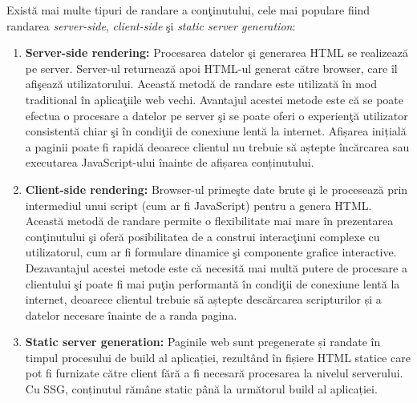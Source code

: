 \documentclass[12pt, a4paper]{report}
\begin{document}
Exist\u a mai multe tipuri de randare a con\c tinutului, cele mai populare fiind randarea \emph{server-side}, \emph{client-side} \c si  \emph{static server generation}: \cite{clientsidevssercerside}
\begin{enumerate}
	\item \textbf{Server-side rendering:} Procesarea datelor \c si generarea HTML se realizeaz\u a pe server. Server-ul returneaz\u a apoi HTML-ul generat c\u atre browser, care \^il afi\c seaz\u a utilizatorului. Aceast\u a metod\u a de randare este utilizat\u a \^in mod traditional \^in aplica\c tiile web vechi. Avantajul acestei metode este c\u a se poate efectua o procesare a datelor pe server \c si se poate oferi o experien\c t\u a utilizator consistent\u a chiar \c si \^in condi\c tii de conexiune lent\u a la internet. Afișarea inițială a paginii poate fi rapidă deoarece clientul nu trebuie să aștepte încărcarea sau executarea JavaScript-ului înainte de afișarea conținutului.
	\item \textbf{Client-side rendering:} Browser-ul prime\c ste date brute \c si le proceseaz\u a prin intermediul unui script (cum ar fi JavaScript) pentru a genera HTML. Aceast\u a metod\u a de randare permite o flexibilitate mai mare \^in prezentarea con\c tinutului \c si ofer\u a posibilitatea de a construi interac\c tiuni complexe cu utilizatorul, cum ar fi formulare dinamice \c si componente grafice interactive. Dezavantajul acestei metode este c\u a necesit\u a mai mult\u a putere de procesare a clientului \c si poate fi mai pu\c tin performant\u a \^in condi\c tii de conexiune lent\u a la internet, deoarece clientul trebuie să aștepte descărcarea scripturilor și a datelor necesare înainte de a randa pagina.
	\item \textbf{Static server generation:} Paginile web sunt pregenerate și randate în timpul procesului de build al aplicației, rezultând în fișiere HTML statice care pot fi furnizate către client fără a fi necesară procesarea la nivelul serverului. Cu SSG, conținutul rămâne static până la următorul build al aplicației.
\end{enumerate}
\end{document}
